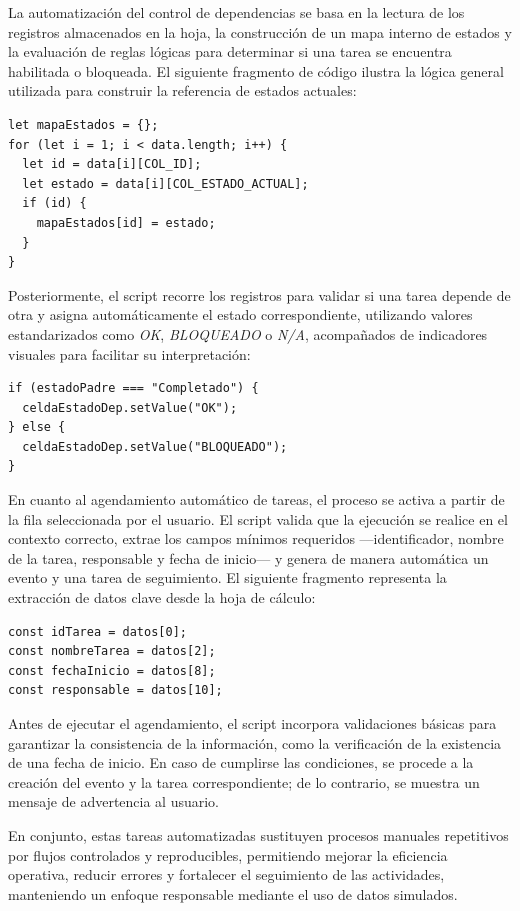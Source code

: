 \documentclass[12pt]{article}
\begin{document}
La automatización del control de dependencias se basa en la lectura de los registros almacenados en la hoja, la construcción de un mapa interno de estados y la evaluación de reglas lógicas para determinar si una tarea se encuentra habilitada o bloqueada. El siguiente fragmento de código ilustra la lógica general utilizada para construir la referencia de estados actuales:

\begin{verbatim}
let mapaEstados = {};
for (let i = 1; i < data.length; i++) {
  let id = data[i][COL_ID];
  let estado = data[i][COL_ESTADO_ACTUAL];
  if (id) {
    mapaEstados[id] = estado;
  }
}
\end{verbatim}

Posteriormente, el script recorre los registros para validar si una tarea depende de otra y asigna automáticamente el estado correspondiente, utilizando valores estandarizados como \textit{OK}, \textit{BLOQUEADO} o \textit{N/A}, acompañados de indicadores visuales para facilitar su interpretación:

\begin{verbatim}
if (estadoPadre === "Completado") {
  celdaEstadoDep.setValue("OK");
} else {
  celdaEstadoDep.setValue("BLOQUEADO");
}
\end{verbatim}

En cuanto al agendamiento automático de tareas, el proceso se activa a partir de la fila seleccionada por el usuario. El script valida que la ejecución se realice en el contexto correcto, extrae los campos mínimos requeridos —identificador, nombre de la tarea, responsable y fecha de inicio— y genera de manera automática un evento y una tarea de seguimiento. El siguiente fragmento representa la extracción de datos clave desde la hoja de cálculo:

\begin{verbatim}
const idTarea = datos[0];
const nombreTarea = datos[2];
const fechaInicio = datos[8];
const responsable = datos[10];
\end{verbatim}

Antes de ejecutar el agendamiento, el script incorpora validaciones básicas para garantizar la consistencia de la información, como la verificación de la existencia de una fecha de inicio. En caso de cumplirse las condiciones, se procede a la creación del evento y la tarea correspondiente; de lo contrario, se muestra un mensaje de advertencia al usuario.

En conjunto, estas tareas automatizadas sustituyen procesos manuales repetitivos por flujos controlados y reproducibles, permitiendo mejorar la eficiencia operativa, reducir errores y fortalecer el seguimiento de las actividades, manteniendo un enfoque responsable mediante el uso de datos simulados.
\end{document}
